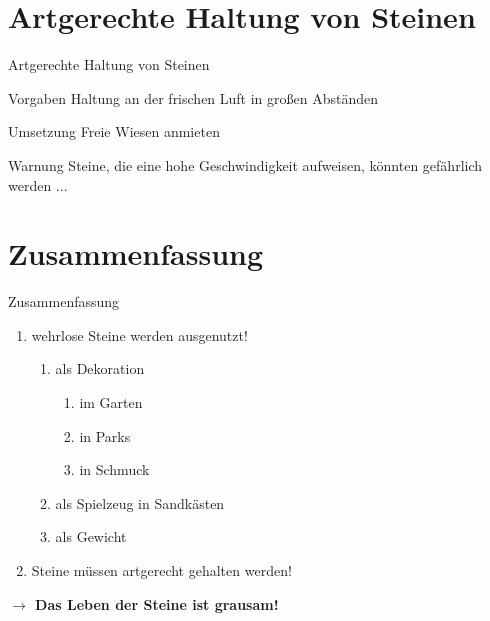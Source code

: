 \documentclass[11pt]{beamer}
\begin{document}
	\section[Artgerechte Haltung]{Artgerechte Haltung von Steinen}
	\begin{frame}{Artgerechte Haltung von Steinen}
		\begin{block}{Vorgaben}
			Haltung an der frischen Luft in großen Abständen
		\end{block}
	
		\begin{exampleblock}{Umsetzung}
			Freie Wiesen anmieten
		\end{exampleblock}
	
		\begin{alertblock}{Warnung}
			Steine, die eine hohe Geschwindigkeit aufweisen, könnten gefährlich werden ...
		\end{alertblock}
	\end{frame}


	\section{Zusammenfassung}
	\begin{frame}{Zusammenfassung}
		\begin{enumerate}
			\item wehrlose Steine werden ausgenutzt!
					\begin{enumerate}
						\item als Dekoration
								\begin{enumerate}
									\item im Garten
									\item in Parks
									\item in Schmuck
								\end{enumerate}
						\item als Spielzeug in Sandkästen
						\item als Gewicht
					\end{enumerate}
			\item Steine müssen artgerecht gehalten werden!
		\end{enumerate}
	
		\bigskip
	
		\textbf{$\rightarrow$ Das Leben der Steine ist grausam!}
	\end{frame}

	
	
\end{document}
